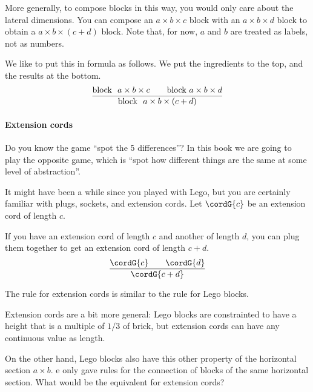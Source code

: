 More generally, to compose blocks in this way, you would only care about the lateral dimensions.
You can compose an $a \times b \times c$ block with an  $a \times b \times d$ block to obtain a  $a \times b \times( c + d)$ block.
Note that, for now, $a$ and $b$ are treated as labels, not as numbers.

We like to put this in formula as follows. We put the ingredients to the top, and the results at the bottom.
%
\begin{equation}
  \frac{\text{block }\ a \times b \times c \qquad\text{block}\ a \times b \times d }{%
    \text{block }\ a \times b \times (c+d)%
  }
\end{equation}

\paragraph{Extension cords}

Do you know the game ``spot the 5 differences''? In this book we are going to play the opposite game, which is ``spot how different things are the same at some level of abstraction''.

It might have been a while since you played with Lego, but you are certainly familiar with plugs, sockets, and extension cords.
Let $\cordG{c}$ be an extension cord of length $c$.

If you have an extension cord of length $c$ and another of length $d$, you can plug them together to get an extension cord of length $c+d$.
%
\begin{equation}
  \frac{\cordG{c} \qquad \cordG{d} }{%
    \cordG{c+d}%
  }
\end{equation}

The rule for extension cords is similar to the rule for Lego blocks.
%


Extension cords are a bit more general: Lego blocks are constrainted to have a height that is a multiple of $1/3$ of brick,  but extension cords can have any continuous value as length.

On the other hand, Lego blocks also have this other property of the horizontal section $a \times b$.
e only gave rules for the connection of blocks of the same horizontal section.
What would be the equivalent for extension cords?

